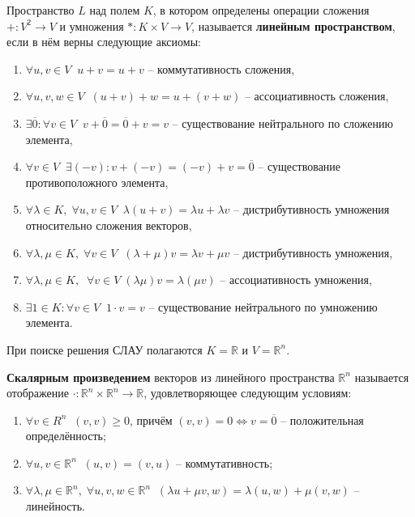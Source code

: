 \documentclass{article}
\begin{document}
\begin{define}
	Пространство $L$ над полем $K$, в котором определены операции сложения
	$+: V^2\rightarrow V$ и умножения $*: K\times V\rightarrow V$,
	называется \textbf{линейным пространством}, если в нём верны следующие
	аксиомы:

	\begin{enumerate}[nosep]
		\item $\forall u,v\in V\;\; u+v=u+v$ -- коммутативность
			сложения,
		\item $\forall u,v,w\in V\;\; (u+v)+w=u+(v+w)$ --
			ассоциативность сложения,
		\item $\exists\overline{0}: \forall v\in V\;\;
			v+\overline{0}=\overline{0}+v=v$ -- существование
			нейтрального по сложению элемента,
		\item $\forall v\in V\;\;\exists (-v): v+(-v)=(-v)+v=
			\overline{0}$ -- существование противоположного
			элемента,
		\item $\forall\lambda\in K,\;\forall u,v\in V\;\; \lambda(u+v)=
			\lambda u+\lambda v$ -- дистрибутивность умножения
			относительно сложения векторов,
		\item $\forall\lambda,\mu\in K,\;\forall v\in V\;\;
			(\lambda+\mu)v=\lambda v+\mu v$ -- дистрибутивность
			умножения,
		\item $\forall\lambda,\mu\in K,\;\;\forall v\in V\; (\lambda\mu)
			v=\lambda(\mu v)$ -- ассоциативность умножения,
		\item $\exists 1\in K: \forall v\in V\;\; 1\cdot v=v$ --
			существование нейтрального по умножению элемента.
	\end{enumerate}
\end{define}

При поиске решения СЛАУ полагаются $K=\mathbb R$ и $V=\mathbb R^n$.

\begin{define}\label{eq:dot_production}
	\textbf{Скалярным произведением} векторов из линейного пространства
	$\mathbb R^n$ называется отображение $\cdot: \mathbb R^n\times
	\mathbb R^n\rightarrow \mathbb R$, удовлетворяющее следующим условиям:
	\begin{enumerate}[nosep]
		\item $\forall v\in R^n\;\; (v,v)\ge 0$, причём $(v,v)=0
			\Leftrightarrow v=\overline{0}$ -- положительная
			определённость;
		\item $\forall u,v\in \mathbb R^n\;\; (u,v)=(v,u)$ --
			коммутативность;
		\item $\forall \lambda,\mu \in\mathbb R^n,\;
			\forall u,v,w\in \mathbb R^n\;\; (\lambda u+\mu v, w)=
			\lambda(u,w)+\mu(v,w)$ -- линейность.
	\end{enumerate}
\end{define}
\newpage
\end{document}
